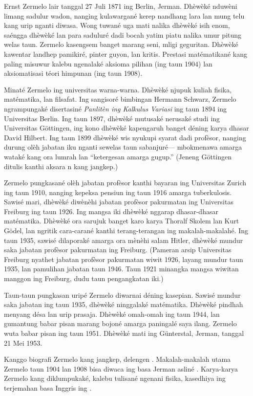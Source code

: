 \documentclass[../../../include/open-logic-section]{subfiles}
\begin{document}



Ernst Zermelo lair tanggal 27 Juli 1871
ing Berlin, Jerman. Dhèwèké nduwèni
limang sadulur wadon, nanging kulawargané
kerep nandhang lara lan mung telu kang
urip nganti diwasa. Wong tuwané uga
mati nalika dhèwèké isih enom,
saéngga dhèwèké lan para saduluré
dadi bocah yatim piatu nalika umur
pitung welas taun. Zermelo kasengsem
banget marang seni, mligi geguritan.
Dhèwèké kawentar landhep pamikiré,
pinter guyon, lan kritis. Prestasi
matématikané kang paling misuwur
kalebu ngenalaké aksioma pilihan
(ing taun 1904) lan aksiomatisasi
téori himpunan (ing taun 1908).

Minaté Zermelo ing universitas
warna-warna. Dhèwèké njupuk
kuliah fisika, matématika, lan
filsafat. Ing sangisoré bimbingan
Hermann Schwarz, Zermelo
ngrampungaké disertasiné
\emph{Panlitèn ing Kalkulus Variasi}
ing taun 1894 ing Universitas
Berlin. Ing taun 1897,
dhèwèké mutusaké nerusaké
studi ing Universitas
G\"{o}ttingen, ing kono
dhèwèké kapengaruh banget
déning karya dhasar
David Hilbert. Ing taun
1899 dhèwèké wis
nyukupi syarat dadi
profèsor, nanging
durung olèh jabatan
iku nganti sewelas
taun sabanjuré---
mbokmenawa amarga
wataké kang ora
lumrah lan ``ketergesan
amarga gugup.''
(Jeneng Göttingen ditulis kanthi aksara n kang jangkep.)

Zermelo pungkasané
olèh jabatan profèsor
kanthi bayaran ing
Universitas Zurich
ing taun 1910,
nanging kepeksa
pensiun ing taun
1916 amarga
tuberkulosis.
Sawisé mari,
dhèwèké diwènèhi
jabatan profèsor
pakurmatan ing
Universitas Freiburg
ing taun 1926.
Ing mangsa iki
dhèwèké nggarap
dhasar-dhasar
matématika. Dhèwèké
ora sarujuk banget
karo karya Thoralf
Skolem lan Kurt
G\"{o}del, lan
ngritik cara-carané
kanthi terang-terangan
ing makalah-makalahé.
Ing taun 1935, sawisé
dilaporaké amarga ora
mènèhi salam Hitler,
dhèwèké mundur saka
jabatan profèsor
pakurmatan ing Freiburg.
(Pameran arsip Universitas Freiburg nyathet jabatan profèsor pakurmatan wiwit 1926, layang mundur taun 1935, lan pamulihan jabatan taun 1946. Taun 1921 minangka mangsa wiwitan manggon ing Freiburg, dudu taun pengangkatan iki.)

Taun-taun pungkasan
uripé Zermelo
diwarnai déning
kasepian. Sawisé
mundur saka jabatan ing taun
1935, dhèwèké
ninggalaké matématika.
Dhèwèké pindhah
menyang désa lan
urip prasaja.
Dhèwèké omah-omah
ing taun 1944,
lan gumantung babar pisan
marang bojoné
amarga paningalé
saya ilang.
Zermelo wuta
babar pisan
ing taun 1951.
Dhèwèké mati
ing G\"{u}nterstal,
Jerman, tanggal
21 Mei 1953.

\begin{reading}
Kanggo biografi
Zermelo kang
jangkep, delengen
\citet{Ebbinghaus2015}.
Makalah-makalah
utama Zermelo
taun 1904 lan
1908 bisa diwaca
ing basa Jerman
asliné
\citep{Zermelo1904,Zermelo1908}.
Karya-karya
Zermelo kang
diklumpukaké,
kalebu tulisané
ngenani fisika,
kasedhiya ing
terjemahan
basa Inggris
ing
\citep{Ebbinghaus2010,Ebbinghaus2013}.
\end{reading}
\end{document}
